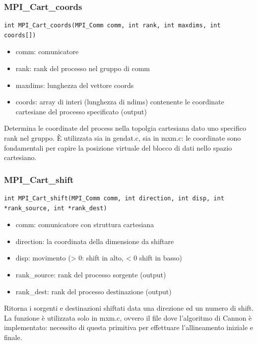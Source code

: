 \subsubsection{MPI\_Cart\_coords}
\begin{lstlisting}
int MPI_Cart_coords(MPI_Comm comm, int rank, int maxdims, int coords[])
\end{lstlisting}
\begin{itemize}
  \item comm: comunicatore
  \item rank: rank del processo nel gruppo di comm
  \item maxdims: lunghezza del vettore coords
  \item coords: array di interi (lunghezza di ndims) contenente le coordinate cartesiane del processo specificato (output)
\end{itemize}

Determina le coordinate del process nella topolgia cartesiana dato uno specifico rank nel gruppo. \`{E} utilizzata sia in gendat.c, sia in mxm.c: le coordinate sono fondamentali per capire la posizione virtuale del blocco di dati nello spazio cartesiano.

\subsubsection{MPI\_Cart\_shift}
\begin{lstlisting}
int MPI_Cart_shift(MPI_Comm comm, int direction, int disp, int *rank_source, int *rank_dest)
\end{lstlisting}
\begin{itemize}
  \item comm: comunicatore con struttura cartesiana
  \item direction: la coordinata della dimensione da shiftare
  \item disp: movimento (> 0: shift in alto, < 0 shift in basso)
  \item rank\_source: rank del processo sorgente (output)
  \item rank\_dest: rank del processo destinazione (output)
\end{itemize}

Ritorna i sorgenti e destinazioni shiftati data una direzione ed un numero di shift. La funzione \`{e} utilizzata solo in mxm.c, ovvero il file dove l'algoritmo di Cannon \`{e} implementato: necessito di questa primitiva per effettuare l'allineamento iniziale e finale.

